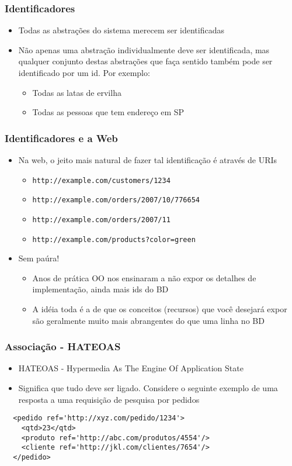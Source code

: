 \documentclass[Ligatures=TeX,table,brazil,svgnames,usetotalslideindicator,comp
ress,10pt]{beamer}
\begin{document}
\begin{frame}
  \frametitle{Identificadores}
  \begin{itemize}
  \item Todas as abstrações do sistema merecem ser
    identificadas
  \item Não apenas uma abstração individualmente deve
    ser identificada, mas qualquer conjunto destas
    abstrações que faça sentido também pode ser
    identificado por um id. Por exemplo:
    \begin{itemize}
    \item Todas as latas de ervilha
    \item Todas as pessoas que tem endereço em SP
    \end{itemize}
  \end{itemize}
\end{frame}

\begin{frame}
  \frametitle{Identificadores e a Web}
  \begin{itemize}
  \item Na web, o jeito mais natural de fazer tal identificação é através de URIs
    \begin{itemize}
    \item \texttt{http://example.com/customers/1234}
    \item \texttt{http://example.com/orders/2007/10/776654}
    \item \texttt{http://example.com/orders/2007/11}
    \item \texttt{http://example.com/products?color=green}
    \end{itemize}
  \item Sem paúra!
    \begin{itemize}
    \item Anos de prática OO nos ensinaram a não expor os detalhes de implementação, ainda mais ids
      do BD
    \item A idéia toda é a de que os conceitos (recursos) que você desejará expor são geralmente
      muito mais abrangentes do que uma linha no BD
    \end{itemize}
  \end{itemize}
\end{frame}


\begin{frame}[fragile]
  \frametitle{Associação - HATEOAS}
  \begin{itemize}
  \item \alert{HATEOAS} - Hypermedia As The Engine Of Application State
  \item Significa que tudo deve ser ligado. Considere o seguinte exemplo de uma resposta a
    uma requisição de pesquisa por pedidos
  \end{itemize}

\begin{verbatim}
  <pedido ref='http://xyz.com/pedido/1234'>
    <qtd>23</qtd>
    <produto ref='http://abc.com/produtos/4554'/>
    <cliente ref='http://jkl.com/clientes/7654'/>
  </pedido>
\end{verbatim}
\end{frame}
\end{document}
